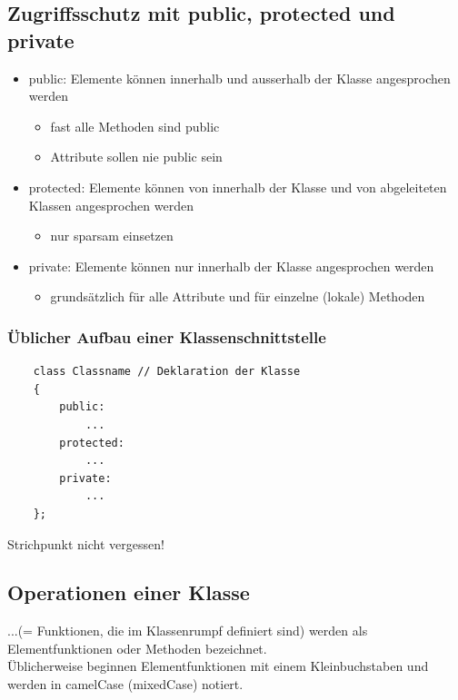 \subsection{Zugriffsschutz mit public, protected und private}
\label{sec:Zugriffsschutz mit public, protected und private}
\begin{itemize}
	\item public: Elemente können innerhalb und ausserhalb der Klasse angesprochen werden
	\begin{itemize}
		\item fast alle Methoden sind public
		\item Attribute sollen nie public sein
	\end{itemize}
	\item protected: Elemente können von innerhalb der Klasse und von abgeleiteten Klassen angesprochen werden
	\begin{itemize}
		\item nur sparsam einsetzen
	\end{itemize}
	\item private: Elemente können nur innerhalb der Klasse angesprochen werden
	\begin{itemize}
		\item grundsätzlich für alle Attribute und für einzelne (lokale) Methoden
	\end{itemize}
\end{itemize}

\subsubsection{Üblicher Aufbau einer Klassenschnittstelle}
\label{sec:Ueblicher Aufbau einer Klassenschnittstelle}
\noindent
\begin{minipage}{\linewidth}
	\begin{lstlisting}
	class Classname	// Deklaration der Klasse
	{
		public:
			...
		protected:
			...
		private:
			...
	};
	\end{lstlisting}
\end{minipage}
\begin{achtung}
	Strichpunkt nicht vergessen!
\end{achtung}

\subsection{Operationen einer Klasse}
\label{sec:Operationen einer Klasse}
...(= Funktionen, die im Klassenrumpf definiert sind) werden als Elementfunktionen oder Methoden bezeichnet.\\
Üblicherweise beginnen Elementfunktionen mit einem Kleinbuchstaben und werden in camelCase (mixedCase) notiert.

